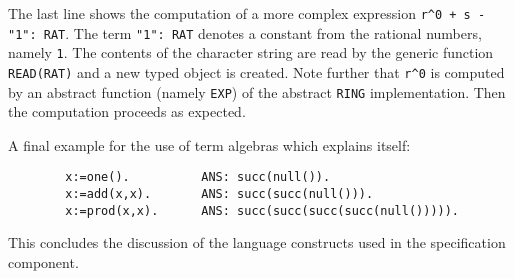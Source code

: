 The last line shows the computation of a more 
complex expression \verb/r^0 + s - "1": RAT/.
The term \verb/"1": RAT/ denotes a constant from 
the rational numbers, namely \verb/1/. The contents of the 
character string are read by the generic function 
\verb/READ(RAT)/ and a new typed object is created. 
Note further that \verb/r^0/ is computed by an abstract function 
(namely \verb/EXP/) of the abstract \verb/RING/ implementation.
Then the computation proceeds as expected.

A final example for the use of term algebras which 
explains itself:
\begin{verbatim}
        x:=one().          ANS: succ(null()).
        x:=add(x,x).       ANS: succ(succ(null())).
        x:=prod(x,x).      ANS: succ(succ(succ(succ(null())))).
\end{verbatim}

This concludes the discussion of the 
language constructs used in the specification component.
